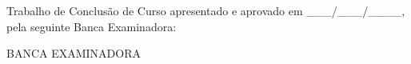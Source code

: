 \begin{folhadeaprovacao}
	\OnehalfSpacing
  
	\begin{center}
	  \MakeUppercase{\imprimirautor}
  
	  \vspace*{\fill}\vspace*{\fill}
	  \begin{center}
			{\bfseries\MakeUppercase{\imprimirtitulo}}
	  \end{center}
	\end{center}
  
	{
	  \hspace*{\fill}
	  \begin{minipage}{.5\textwidth}%
		\SingleSpacing
		\imprimirpreambulo%
	  \end{minipage}%
	}
	  \vspace*{\fill}
	  \vspace*{\fill}
	  \vspace*{\fill}
  
  Trabalho de Conclusão de Curso apresentado e aprovado em \_\_\_/\_\_\_/\_\_\_\_, pela seguinte Banca Examinadora:
  
	\centering
	  \begin{center}%
		BANCA EXAMINADORA
	  \end{center}%
  
  
  
  
	\vspace*{\fill}
	\begin{center}
	  \begin{SingleSpacing}
		\imprimirlocal{}\\
		\imprimirdata
	  \end{SingleSpacing}
	\end{center}
  
  \end{folhadeaprovacao}
